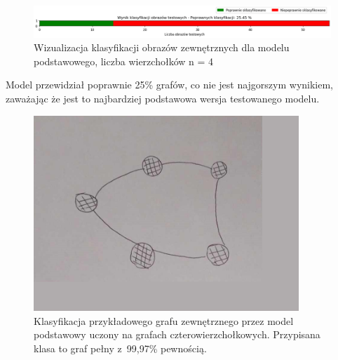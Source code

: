\begin{figure}[ht]
	\centering
	\includegraphics[width=14cm]{resources/tests/images/v3/base4_bar.png}
	\caption{Wizualizacja klasyfikacji obrazów zewnętrznych dla modelu podstawowego, liczba wierzchołków n = 4}
	\label{Fig:tests-base-1c}
\end{figure}
\FloatBarrier

Model przewidział poprawnie 25\% grafów, co nie jest najgorszym wynikiem,
zaważając że jest to najbardziej podstawowa wersja testowanego modelu.

\begin{figure}[ht]
	\centering
	\includegraphics[width=10cm]{../graph_classification/test_graphs/drawn/cycle-1.png}
	\caption{Klasyfikacja przykładowego grafu zewnętrznego przez model podstawowy uczony na grafach czterowierzchołkowych.
		Przypisana klasa to graf pełny z~99,97\% pewnością.}
	\label{Fig:tests-base-1d}
\end{figure}
\FloatBarrier



